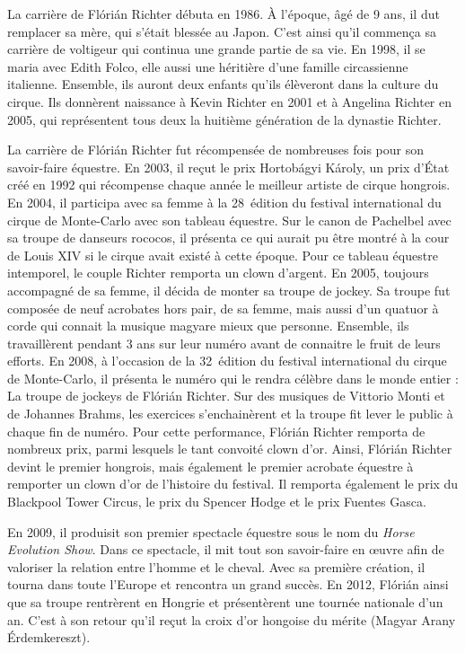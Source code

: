 La carrière de Flórián Richter débuta en 1986. À l’époque, âgé de 9 ans, il dut remplacer sa mère, qui s’était blessée au Japon. C’est ainsi qu’il commença sa carrière de voltigeur qui continua une grande partie de sa vie. En 1998, il se maria avec Edith Folco, elle aussi une héritière d’une famille circassienne italienne. Ensemble, ils auront deux enfants qu’ils élèveront dans la culture du cirque. Ils donnèrent naissance à Kevin Richter en 2001 et à Angelina Richter en 2005, qui représentent tous deux la huitième génération de la dynastie Richter.

La carrière de Flórián Richter fut récompensée de nombreuses fois pour son savoir-faire équestre. En 2003, il reçut le prix Hortobágyi Károly, un prix d’État créé en 1992 qui récompense chaque année le meilleur artiste de cirque hongrois. En 2004, il participa avec sa femme à la 28\ieme~édition du festival international du cirque de Monte-Carlo avec son tableau équestre. Sur le canon de Pachelbel avec sa troupe de danseurs rococos, il présenta ce qui aurait pu être montré à la cour de Louis XIV si le cirque avait existé à cette époque. Pour ce tableau équestre intemporel, le couple Richter remporta un clown d’argent. En 2005, toujours accompagné de sa femme, il décida de monter sa troupe de jockey. Sa troupe fut composée de neuf acrobates hors pair, de sa femme, mais aussi d’un quatuor à corde qui connait la musique magyare mieux que personne. Ensemble, ils travaillèrent pendant 3 ans sur leur numéro avant de connaitre le fruit de leurs efforts. En 2008, à l’occasion de la 32\ieme~édition du festival international du cirque de Monte-Carlo, il présenta le numéro qui le rendra célèbre dans le monde entier : La troupe de jockeys de Flórián Richter. Sur des musiques de Vittorio Monti et de Johannes Brahms, les exercices s’enchainèrent et la troupe fit lever le public à chaque fin de numéro. Pour cette performance, Flórián Richter remporta de nombreux prix, parmi lesquels le tant convoité clown d’or. Ainsi, Flórián Richter devint le premier hongrois, mais également le premier acrobate équestre à remporter un clown d’or de l’histoire du festival. Il remporta également le prix du Blackpool Tower Circus, le prix du Spencer Hodge et le prix Fuentes Gasca.

En 2009, il produisit son premier spectacle équestre sous le nom du \textit{Horse Evolution Show}. Dans ce spectacle, il mit tout son savoir-faire en œuvre afin de valoriser la relation entre l’homme et le cheval. Avec sa première création, il tourna dans toute l’Europe et rencontra un grand succès. En 2012, Flórián ainsi que sa troupe rentrèrent en Hongrie et présentèrent une tournée nationale d’un an. C’est à son retour qu’il reçut la croix d’or hongoise du mérite (Magyar Arany Érdemkereszt).

